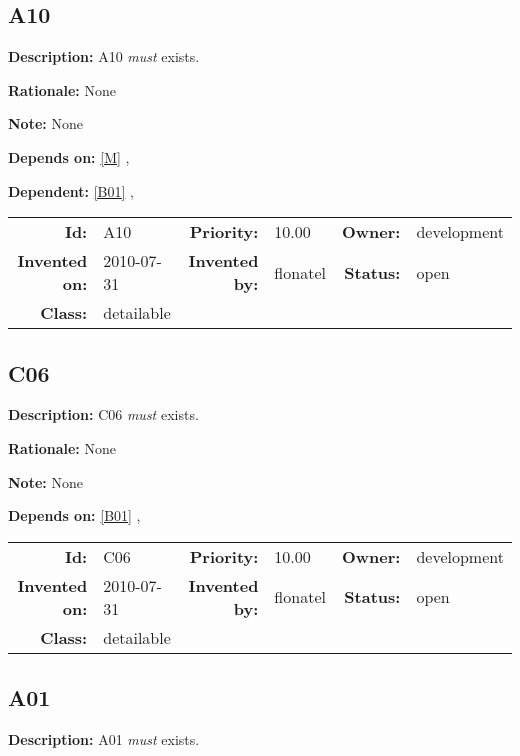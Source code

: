 \subsection{A10}\label{A10}
\textbf{Description:} A10 \textsl{must} exists.

\textbf{Rationale:} None

\textbf{Note:} None

\textbf{Depends on:} \ref{M} , 

\textbf{Dependent:} \ref{B01} , 

\par
{\small \begin{center}\begin{tabular}{rlrlrl}
\textbf{Id:} & A10 & \textbf{Priority:} & 10.00 & \textbf{Owner:} & development \\ 
\textbf{Invented on:} & 2010-07-31 & \textbf{Invented by:} & flonatel & \textbf{Status:} & open \\ 
\textbf{Class:} & detailable & & & & \\ 
\end{tabular}\end{center} }%
\subsection{C06}\label{C06}
\textbf{Description:} C06 \textsl{must} exists.

\textbf{Rationale:} None

\textbf{Note:} None

\textbf{Depends on:} \ref{B01} , 

\par
{\small \begin{center}\begin{tabular}{rlrlrl}
\textbf{Id:} & C06 & \textbf{Priority:} & 10.00 & \textbf{Owner:} & development \\ 
\textbf{Invented on:} & 2010-07-31 & \textbf{Invented by:} & flonatel & \textbf{Status:} & open \\ 
\textbf{Class:} & detailable & & & & \\ 
\end{tabular}\end{center} }%
\subsection{A01}\label{A01}
\textbf{Description:} A01 \textsl{must} exists.

